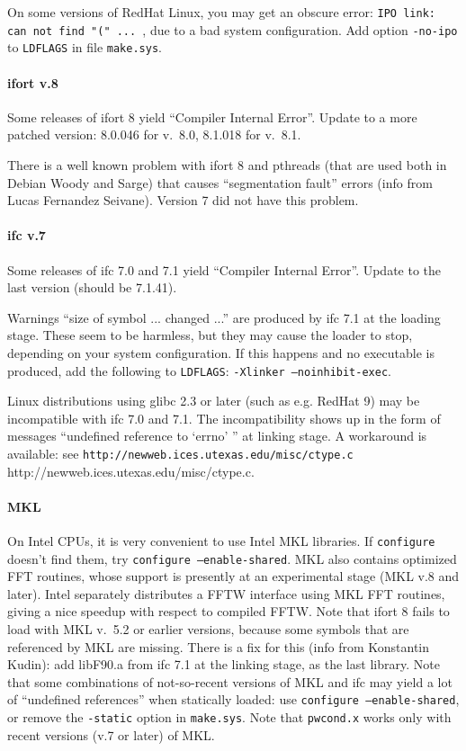\documentclass[12pt,a4paper]{article}
\begin{document}
On some versions of RedHat Linux, you may get an obscure error: 
\texttt{IPO link: can not find "(" ... }, due to a bad system
configuration. Add option \texttt{-no-ipo} to \texttt{LDFLAGS} 
in file \texttt{make.sys}.

\paragraph{ifort v.8}

Some releases of ifort 8 yield ``Compiler Internal Error''. 
Update to a more patched version: 8.0.046 for v.~8.0,
8.1.018 for v.~8.1.

There is a well known problem with ifort 8 and pthreads 
(that are used both in Debian Woody and Sarge) that causes
``segmentation fault'' errors (info from Lucas Fernandez Seivane). 
Version 7 did not have this problem.

\paragraph{ifc v.7}

Some releases of ifc 7.0 and 7.1 yield ``Compiler Internal 
Error''. Update to the last version (should be 7.1.41).

Warnings ``size of symbol ... changed ...'' are produced by ifc 7.1 at
the loading stage.
These seem to be harmless, but they may cause the loader to stop,
depending on your system configuration.
If this happens and no executable is produced, add the following to
\texttt{LDFLAGS}: \texttt{-Xlinker --noinhibit-exec}.

Linux distributions using glibc 2.3 or later (such as e.g. RedHat 9)
may be incompatible with ifc 7.0 and 7.1.
The incompatibility shows up in the form of messages ``undefined
reference to `errno' '' at linking stage.
A workaround is available: see
\htmladdnormallink%
{\texttt{http://newweb.ices.utexas.edu/misc/ctype.c}}%
{http://newweb.ices.utexas.edu/misc/ctype.c}.

\paragraph{MKL}

On Intel CPUs, it is very convenient to use Intel MKL libraries.
If \texttt{configure} doesn't find them, try
\texttt{configure --enable-shared}.
MKL also contains optimized FFT routines, whose support is presently
at an experimental stage (MKL v.8 and later). Intel separately
distributes a FFTW interface using MKL FFT routines, giving a nice
speedup with respect to compiled FFTW.
Note that ifort 8 fails to load with MKL v.~5.2 or earlier versions,
because some symbols that are referenced by MKL are missing. There
is a fix for this (info from Konstantin Kudin): add libF90.a from 
ifc 7.1 at the linking stage, as the last library.
Note that some combinations of not-so-recent versions of MKL 
and ifc may yield a lot of ``undefined references'' when statically 
loaded: use \texttt{configure --enable-shared}, 
or remove the \texttt{-static} option in \texttt{make.sys}.
Note that \texttt{pwcond.x} works only with recent versions
(v.7 or later) of MKL.
\end{document}
